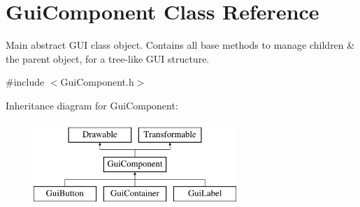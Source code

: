 \hypertarget{class_gui_component}{}\section{Gui\+Component Class Reference}
\label{class_gui_component}


Main abstract G\+UI class object. Contains all base methods to manage children \& the parent object, for a tree-\/like G\+UI structure.  




{\ttfamily \#include $<$Gui\+Component.\+h$>$}

Inheritance diagram for Gui\+Component\+:\begin{figure}[H]
\begin{center}
\leavevmode
\includegraphics[height=3.000000cm]{class_gui_component}
\end{center}
\end{figure}
